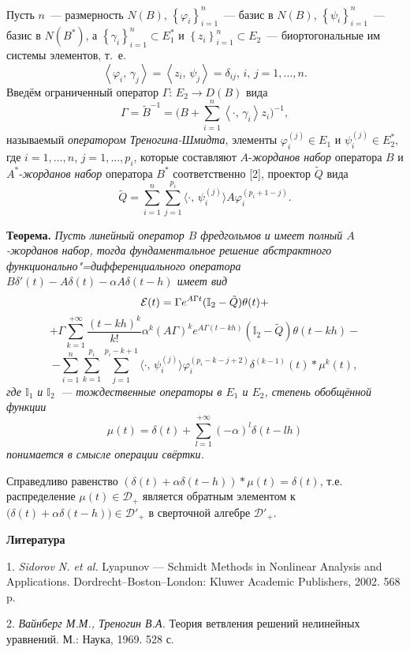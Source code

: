Пусть $n$~--- размерность $N(B)$, $\left\{\varphi_{i}\right\}_{i=1}^{n}$~--- базис в $N(B)$, $\left\{\psi_{i}\right\}_{i=1}^{n}$~--- базис в $N(B^{\ast})$, а $\left\{\gamma_{i}\right\}_{i=1}^{n}\subset E_{1}^{\ast}$ и $\left\{z_{i}\right\}_{i=1}^{n}\subset E_{2}$~--- биортогональные им системы элементов, т.~е.
$$
\left\langle \varphi_{i},\,\gamma_{j}\right\rangle=\left\langle z_{i},\, \psi_{j}\right\rangle=\delta_{ij},\,i,\,j=1,\ldots,n.
$$
Введём ограниченный оператор $\Gamma:\,E_{2}\to D(B)$ вида
$$
\Gamma=\tilde{B}^{-1}=\biggl(B+\sum\limits_{i=1}^{n}\left\langle\cdot,\, \gamma_{i}\right\rangle z_{i}\biggr)^{-1},
$$
называемый {\it оператором Треногина\--Шмидта}, элементы $\varphi^{(j)}_{i}\in E_{1}$ и $\psi^{(j)}_{i}\in E_{2}^{\ast}$, где $i=1,\ldots,n$, $j=1,\ldots,p_{i}$, которые составляют $A$-{\it жорданов набор} оператора $B$ и $A^{*}$-{\it жорданов набор} оператора $B^{*}$ соответственно [2], проектор $\tilde{Q}$ вида
$$
\tilde{Q}=\sum\limits_{i=1}^{n}\sum\limits_{j=1}^{p_{i}}\langle\cdot,\, \psi_{i}^{(j)}\rangle A\varphi^{(p_{i}+1-j)}_{i}.
$$

\textbf{Теорема.} {\it Пусть линейный оператор $B$ фредгольмов и имеет полный $A$-жорданов набор, тогда фундаментальное решение абстрактного функционально"=дифференциального оператора $B\delta'(t)-A\delta(t)-\alpha A\delta(t-h)$ имеет вид
$$
{\cal E}(t)=\Gamma e^{A\Gamma t}({\mathbb I}_{2}-\tilde{Q})\theta(t)+
$$
$$
+\Gamma\sum\limits_{k=1}^{+\infty}\frac{(t-kh)^{k}}{k!}\alpha^{k}(A\Gamma)^k e^{A\Gamma (t-kh)}({\mathbb I}_{2}-\tilde{Q})\theta(t-kh)-
$$
$$
 -\sum\limits_{i=1}^{n}\sum\limits_{k=1}^{p_{i}}\sum\limits_{j=1}^{p_{i}-k+1}\langle\cdot,\,\psi^{(j)}_{i}\rangle\varphi^{(p_{i}-k-j+2)}_{i}\delta^{(k-1)}(t)\ast\mu^{k}(t),
$$
где ${\mathbb I}_{1}$ и ${\mathbb I}_{2}$~--- тождественные операторы в $E_{1}$ и $E_{2}$, степень обобщённой функции
$$
\mu(t)=\delta(t)+\sum\limits_{l=1}^{+\infty}(-\alpha)^{l}\delta(t-lh)
$$
понимается в смысле операции свёртки.}

Справедливо равенство $(\delta(t)+\alpha\delta(t-h))\ast\mu(t)=\delta(t)$, т.е. распределение $\mu(t)\in{\mathcal D}_{+}$ является обратным элементом к $\bigl(\delta(t)+\alpha\delta(t-h)\bigr)\in{\mathcal D}'_{+}$ в сверточной алгебре ${\mathcal D}'_{+}$.

\smallskip \centerline {\bf Литература} \nopagebreak

1. {\it Sidorov N. et al.} Lyapunov --- Schmidt Methods in Non\-linear Analysis and Applications. Dordrecht--Boston--London: Kluwer Academic Publishers, 2002. 568 p.

2. {\it Вайнберг М.М., Треногин В.А.} Теория ветвления решений нелинейных уравнений. М.: Наука, 1969. 528 с.
